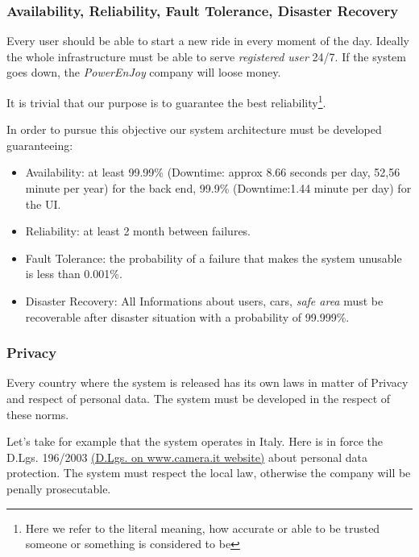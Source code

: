 \documentclass[english]{article}
\newcommand{\powerenjoy}{\textit{PowerEnJoy }}
\newcommand{\registereduser}{\textit {registered user }}
\newcommand{\safearea}{\textit{safe area }}
\begin{document}
		\subsubsection{Availability, Reliability, Fault Tolerance, Disaster Recovery}
		Every user should be able to start a new ride in every moment of the day. Ideally the whole  infrastructure must be able to serve \registereduser 24/7. If the system goes down, the \powerenjoy company will loose money. \par It is trivial that our purpose is to guarantee the best reliability\footnote{Here we refer to the literal meaning, how accurate or able to be trusted someone or something is considered to be}.\par In order to pursue this objective our system architecture must be developed guaranteeing:
		\begin{itemize}
			\item Availability: at least 99.99\% (Downtime: approx 8.66 seconds per day, 52,56 minute per year) for the back end, 99.9\% (Downtime:1.44 minute per day) for the UI.
			\item Reliability: at least 2 month between failures.
			\item Fault Tolerance: the probability of a failure that makes the system unusable is less than 0.001\%.
			\item Disaster Recovery: All Informations about users, cars, \safearea must be recoverable after disaster situation with a probability of 99.999\%.
		\end{itemize}
		\subsubsection{Privacy}
		Every country where the system is released has its own laws in matter of Privacy and respect of personal data. The system must be developed in the respect of these norms.\par Let's take for example that the system operates in Italy. Here is in force the D.Lgs. 196/2003 \href{http://www.camera.it/parlam/leggi/deleghe/03196dl.htm}{(D.Lgs. on www.camera.it website)} about personal data protection. The system must respect the local law, otherwise the company will be penally prosecutable.
\end{document}
